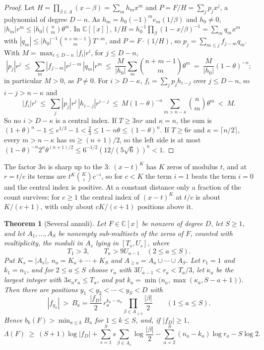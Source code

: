 \documentclass[11pt]{article}
\newtheorem{theorem}{Theorem}[section]
\begin{document}
\begin{proof}
Let $H=\prod_{\beta\in A}(x-\beta)=\sum_mh_mx^m$ and $P=F/H=\sum_jp_jx^j$, a
polynomial of degree $D-n$.  As $h_m=h_0(-1)^me_m(1/\beta)$ and $h_0\ne0$,
$|h_m|r^m\le|h_0|\binom nm\theta^m$.  In $\mathbb C[[x]]$,
$1/H=h_0^{-1}\prod_\beta(1-x/\beta)^{-1}=\sum_mq_mx^m$ with
$|q_m|\le|h_0|^{-1}\binom{n+m-1}mT^{-m}$, and $P=F\cdot(1/H)$, so
$p_j=\sum_{m\le j}f_{j-m}q_m$.  With $M=\max_{i\le D-n}|f_i|r^i$, for
$j\le D-n$,
\[
  |p_j|r^j\ \le\ \sum_m|f_{j-m}|r^{j-m}\,|q_m|r^m
  \ \le\ \frac M{|h_0|}\sum_m\binom{n+m-1}m\theta^m\ =\ \frac M{|h_0|}(1-\theta)^{-n};
\]
in particular $M>0$, as $P\ne0$.  For $i>D-\kappa$, $f_i=\sum_jp_jh_{i-j}$
over $j\le D-n$, so $i-j>n-\kappa$ and
\[
  |f_i|r^i\ \le\ \sum_j|p_j|r^j\,|h_{i-j}|r^{i-j}
  \ \le\ M(1-\theta)^{-n}\sum_{m>n-\kappa}\binom nm\theta^m\ <\ M .
\]
So no $i>D-\kappa$ is a central index.  If $T\ge3nr$ and $\kappa=n$, the sum
is $(1+\theta)^n-1\le e^{1/3}-1<\frac23\le1-n\theta\le(1-\theta)^n$.  If $T\ge6r$ and
$\kappa=\lceil n/2\rceil$, every $m>n-\kappa$ has $m\ge(n+1)/2$, so the left
side is at most $(1-\theta)^{-n}2^n\theta^{(n+1)/2}\le6^{-1/2}(12/(5\sqrt6))^n<1$.
\end{proof}

The factor $3n$ is sharp up to the $3$: $(x-t)^K$ has $K$ zeros of modulus
$t$, and at $r=t/c$ its terms are $t^K\binom Kic^{-i}$, so for $c<K$ the term
$i=1$ beats the term $i=0$ and the central index is positive.  At a constant
distance only a fraction of the count survives: for $c\ge1$ the central
index of $(x-t)^K$ at $t/c$ is about $K/(c+1)$, with only about $cK/(c+1)$
positions above it.

\begin{theorem}[Several annuli]\label{thm:annuli}
Let $F\in\mathbb C[x]$ be nonzero of degree $D$, let $S\ge1$, and let
$A_1,\ldots,A_S$ be nonempty sub-multisets of the zeros of $F$, counted with
multiplicity, the moduli in $A_s$ lying in $[T_s,U_s]$, where
\[
  T_1>3,\qquad T_a>9U_{a-1}\quad(2\le a\le S).
\]
Put $K_s=|A_s|$, $n_a=K_a+\cdots+K_S$ and $A_{\ge a}=A_a\cup\cdots\cup A_S$.
Let $r_1=1$ and $k_1=n_1$, and for $2\le a\le S$ choose $r_a$ with
$3U_{a-1}<r_a<T_a/3$, let $\kappa_a$ be the largest integer with
$3\kappa_ar_a\le T_a$, and put $k_a=\min\bigl(n_a,\max(\kappa_a,S-a+1)\bigr)$.
Then there are positions $y_1<y_2<\cdots<y_S<D$ with
\[
  |f_{y_a}|\ >\ B_a=\frac{|f_D|}2\,r_a^{k_a-n_a}\prod_{\beta\in A_{\ge a}}\frac{|\beta|}2
  \qquad(1\le a\le S).
\]
Hence $b_k(F)>\min_{a\le k}B_a$ for $1\le k\le S$, and, if $|f_D|\ge1$,
\[
  \Lambda(F)\ \ge\ (S+1)\log|f_D|+\sum_{s=1}^Ss\sum_{\beta\in A_s}\log\frac{|\beta|}2
  -\sum_{a=2}^S(n_a-k_a)\log r_a-S\log2 .
\]
\end{theorem}
\end{document}
